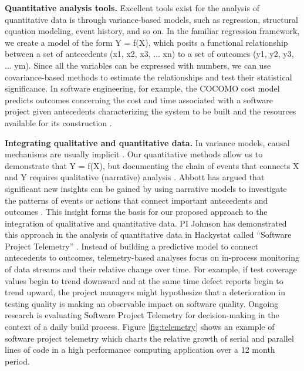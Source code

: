 {\bf Quantitative analysis tools.}  Excellent tools exist for the analysis
of quantitative data is through variance-based models, such as regression,
structural equation modeling, event history, and so on.  In the familiar
regression framework, we create a model of the form Y = f(X), which posits
a functional relationship between a set of antecedents (x1, x2, x3, ... xn)
to a set of outcomes (y1, y2, y3, ... ym).  Since all the variables can be
expressed with numbers, we can use covariance-based methods to estimate the
relationships and test their statistical significance.  In software
engineering, for example, the COCOMO cost model predicts outcomes
concerning the cost and time associated with a software project given
antecedents characterizing the system to be built and the resources
available for its construction \cite{Boehm00}.

{\bf Integrating qualitative and quantitative data.} In variance models,
causal mechanisms are usually implicit
\cite{Abbott91,Lawrence97,Griffin93}.  Our quantitative methods allow us to
demonstrate that Y = f(X), but documenting the chain of events that
connects X and Y requires qualitative (narrative) analysis
\cite{Abbott91,Griffin93,Corsaro90,Heise89}. Abbott has argued that
significant new insights can be gained by using narrative models to
investigate the patterns of events or actions that connect important
antecedents and outcomes \cite{Abbott90a, Abbott91,Abbott95}. This insight
forms the basis for our proposed approach to the integration of qualitative
and quantitative data.  PI Johnson has demonstrated this approach in the
analysis of quantitative data in Hackystat called ``Software Project
Telemetry'' \cite{csdl2-04-11}.  Instead of building a predictive model to
connect antecedents to outcomes, telemetry-based analyses focus on
in-process monitoring of data streams and their relative change over time.
For example, if test coverage values begin to trend downward and at the
same time defect reports begin to trend upward, the project managers might
hypothesize that a deterioration in testing quality is making an observable
impact on software quality.  Ongoing research is evaluating Software
Project Telemetry for decision-making in the context of a daily build
process.  Figure \ref{fig:telemetry} shows an example of software project
telemetry which charts the relative growth of serial and parallel lines of
code in a high performance computing application over a 12 month period.


